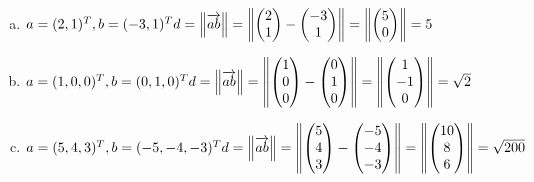 \documentclass{standalone}
\begin{document}
\begin{enumerate}[a)]
    \item $ a = (2,1)^T, b = (-3,1)^T \\
    d = \left\lVert\overrightarrow{ab}\right\rVert = \left\lVert\begin{pmatrix}
        2 \\ 1
    \end{pmatrix}
    -\begin{pmatrix}
        -3 \\ 1
    \end{pmatrix}\right\rVert
    = \left\lVert\begin{pmatrix}
        5 \\ 0
    \end{pmatrix}\right\rVert = 5$

    \item $ a = (1,0,0)^T, b = (0,1,0)^T \\
    d = \left\lVert\overrightarrow{ab}\right\rVert = \left\lVert\begin{pmatrix}
        1 \\ 0 \\ 0
    \end{pmatrix}
    -\begin{pmatrix}
        0 \\ 1 \\ 0
    \end{pmatrix}\right\rVert
    = \left\lVert\begin{pmatrix}
        1 \\ -1 \\ 0
    \end{pmatrix}\right\rVert = \sqrt{2}$

    \item $ a = (5,4,3)^T, b = (-5,-4,-3)^T \\
    d = \left\lVert\overrightarrow{ab}\right\rVert = \left\lVert\begin{pmatrix}
        5 \\ 4 \\ 3
    \end{pmatrix}
    -\begin{pmatrix}
        -5 \\ -4 \\ -3
    \end{pmatrix}\right\rVert
    = \left\lVert\begin{pmatrix}
        10 \\ 8 \\ 6
    \end{pmatrix}\right\rVert = \sqrt{200}$
\end{enumerate}
\end{document}
